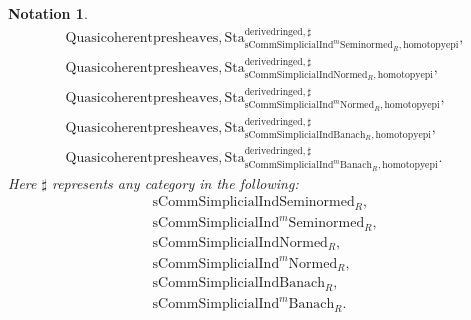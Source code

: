 \documentclass[12pt]{book}
\newtheorem{notation}{Notation}
\begin{document}
\begin{notation}
\begin{align}
&\mathrm{Quasicoherentpresheaves,Sta}^\mathrm{derivedringed,\sharp}_{\mathrm{sComm}\mathrm{Simplicial}\mathrm{Ind}^m\mathrm{Seminormed}_R,\mathrm{homotopyepi}},\\
&\mathrm{Quasicoherentpresheaves,Sta}^\mathrm{derivedringed,\sharp}_{\mathrm{sComm}\mathrm{Simplicial}\mathrm{Ind}\mathrm{Normed}_R,\mathrm{homotopyepi}},\\
&\mathrm{Quasicoherentpresheaves,Sta}^\mathrm{derivedringed,\sharp}_{\mathrm{sComm}\mathrm{Simplicial}\mathrm{Ind}^m\mathrm{Normed}_R,\mathrm{homotopyepi}},\\
&\mathrm{Quasicoherentpresheaves,Sta}^\mathrm{derivedringed,\sharp}_{\mathrm{sComm}\mathrm{Simplicial}\mathrm{Ind}\mathrm{Banach}_R,\mathrm{homotopyepi}},\\
&\mathrm{Quasicoherentpresheaves,Sta}^\mathrm{derivedringed,\sharp}_{\mathrm{sComm}\mathrm{Simplicial}\mathrm{Ind}^m\mathrm{Banach}_R,\mathrm{homotopyepi}}.	
\end{align}
Here $\sharp$ represents any category in the following:
\begin{align}
&\mathrm{sComm}\mathrm{Simplicial}\mathrm{Ind}\mathrm{Seminormed}_R,\\
&\mathrm{sComm}\mathrm{Simplicial}\mathrm{Ind}^m\mathrm{Seminormed}_R,\\
&\mathrm{sComm}\mathrm{Simplicial}\mathrm{Ind}\mathrm{Normed}_R,\\
&\mathrm{sComm}\mathrm{Simplicial}\mathrm{Ind}^m\mathrm{Normed}_R,\\
&\mathrm{sComm}\mathrm{Simplicial}\mathrm{Ind}\mathrm{Banach}_R,\\
&\mathrm{sComm}\mathrm{Simplicial}\mathrm{Ind}^m\mathrm{Banach}_R.	
\end{align} 
\end{notation}
\end{document}
